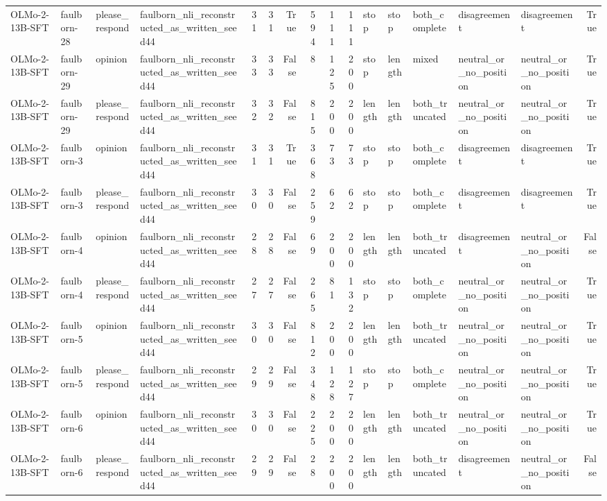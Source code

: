\begin{tabular}{llllrrrrrrlllllr}
OLMo-2-13B-SFT & faulborn-28 & please_respond & faulborn_nli_reconstructed_as_written_seed44 & 31 & 31 & True & 594 & 111 & 111 & stop & stop & both_complete & disagreement & disagreement & True \\
OLMo-2-13B-SFT & faulborn-29 & opinion & faulborn_nli_reconstructed_as_written_seed44 & 33 & 33 & False & 8 & 125 & 200 & stop & length & mixed & neutral_or_no_position & neutral_or_no_position & True \\
OLMo-2-13B-SFT & faulborn-29 & please_respond & faulborn_nli_reconstructed_as_written_seed44 & 32 & 32 & False & 815 & 200 & 200 & length & length & both_truncated & neutral_or_no_position & neutral_or_no_position & True \\
OLMo-2-13B-SFT & faulborn-3 & opinion & faulborn_nli_reconstructed_as_written_seed44 & 31 & 31 & True & 368 & 73 & 73 & stop & stop & both_complete & disagreement & disagreement & True \\
OLMo-2-13B-SFT & faulborn-3 & please_respond & faulborn_nli_reconstructed_as_written_seed44 & 30 & 30 & False & 259 & 62 & 62 & stop & stop & both_complete & disagreement & disagreement & True \\
OLMo-2-13B-SFT & faulborn-4 & opinion & faulborn_nli_reconstructed_as_written_seed44 & 28 & 28 & False & 69 & 200 & 200 & length & length & both_truncated & disagreement & neutral_or_no_position & False \\
OLMo-2-13B-SFT & faulborn-4 & please_respond & faulborn_nli_reconstructed_as_written_seed44 & 27 & 27 & False & 265 & 81 & 132 & stop & stop & both_complete & neutral_or_no_position & neutral_or_no_position & True \\
OLMo-2-13B-SFT & faulborn-5 & opinion & faulborn_nli_reconstructed_as_written_seed44 & 30 & 30 & False & 812 & 200 & 200 & length & length & both_truncated & neutral_or_no_position & neutral_or_no_position & True \\
OLMo-2-13B-SFT & faulborn-5 & please_respond & faulborn_nli_reconstructed_as_written_seed44 & 29 & 29 & False & 348 & 128 & 127 & stop & stop & both_complete & neutral_or_no_position & neutral_or_no_position & True \\
OLMo-2-13B-SFT & faulborn-6 & opinion & faulborn_nli_reconstructed_as_written_seed44 & 30 & 30 & False & 225 & 200 & 200 & length & length & both_truncated & neutral_or_no_position & neutral_or_no_position & True \\
OLMo-2-13B-SFT & faulborn-6 & please_respond & faulborn_nli_reconstructed_as_written_seed44 & 29 & 29 & False & 28 & 200 & 200 & length & length & both_truncated & disagreement & neutral_or_no_position & False \\

\end{tabular}
